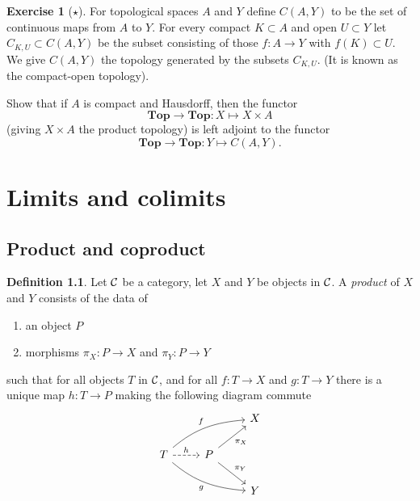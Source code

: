 \documentclass[11pt]{amsbook}
\def\Top{\mathbf{Top}}
\theoremstyle{plain}
\theoremstyle{definition}
\newtheorem{definition}[theorem]{Definition}
\newtheorem{exercise}{Exercise}
\begin{document}
\begin{exercise}[$\star$]
For topological spaces $A$ and $Y$ define $C(A,Y)$ to be the set of continuous maps from $A$ to $Y$.  For every compact $K\subset A$ and open $U\subset Y$ let $C_{K,U}\subset C(A,Y)$ be the subset consisting of those $f\colon A\to Y$ with $f(K)\subset U$. We give $C(A,Y)$ the topology generated by the subsets $C_{K,U}$. (It is known as the compact-open topology). 

Show that if $A$ is compact and Hausdorff, then the functor
\[
	\Top \to \Top \colon X \mapsto X\times A
\]
(giving $X\times A$ the product topology) is left adjoint to the functor
\[
	\Top \to \Top\colon Y \mapsto C(A,Y).
\]
\end{exercise}



\chapter{Limits and colimits}\label{chapter:limits-and-colimits}





\section{Product and coproduct}

\begin{definition}
Let ${\mathcal{C}}$ be a category, let $X$ and $Y$ be objects in ${\mathcal{C}}$.  A \emph{product} of $X$ and $Y$
consists of the data of
\begin{enumerate}
\item an object $P$
\item  morphisms $\pi_X\colon P \to X$ and $\pi_Y\colon P \to Y$
\end{enumerate}
such that for all objects $T$ in ${\mathcal{C}}$, and for all $f\colon T\to X$ and $g\colon T\to Y$ there is a unique map $h\colon T \to P$ making the following diagram commute
\[
\begin{tikzcd}
& & X \\
T \arrow[out=40,in=185]{rru}{f} \arrow[out=-40,in=175,swap]{rrd}{g} \arrow[dashed]{r}{h}
	& P \arrow[swap]{ru}{\pi_X} \arrow{rd}{\pi_Y} & \\
& & Y 
\end{tikzcd}
\]
\end{definition}
\end{document}
